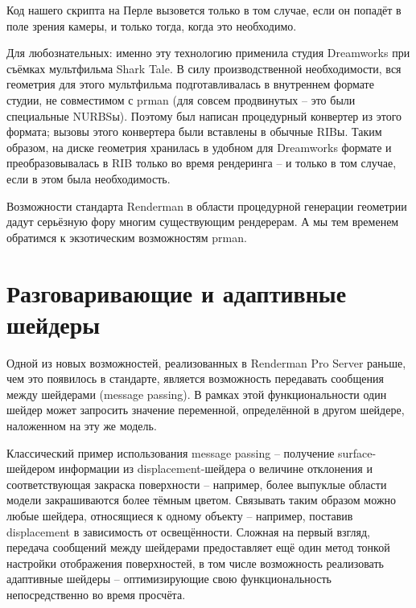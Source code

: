  Код нашего скрипта на Перле вызовется только в том
    случае, если он попадёт в поле зрения камеры, и только тогда, когда
    это необходимо.
  

 Для
    любознательных: именно эту технологию
    применила студия Dreamworks при съёмках мультфильма Shark Tale. В
    силу производственной необходимости, вся геометрия для этого
    мультфильма подготавливалась в внутреннем формате студии, не
    совместимом с prman (для совсем продвинутых – это были специальные
    NURBSы). Поэтому был написан процедурный конвертер из этого
    формата; вызовы этого конвертера были вставлены в обычные RIBы.
    Таким образом, на диске геометрия хранилась в удобном для
    Dreamworks формате и преобразовывалась в RIB только во время
    рендеринга – и только в том случае, если в этом была
    необходимость.
  

 Возможности стандарта Renderman в области
    процедурной генерации геометрии дадут серьёзную фору многим
    существующим рендерерам. А мы тем временем обратимся к экзотическим
    возможностям prman.
 
 \section*{Разговаривающие и адаптивные шейдеры}
  

 Одной из новых возможностей, реализованных в
    Renderman Pro Server раньше, чем это появилось в стандарте,
    является возможность передавать сообщения между шейдерами (message
    passing). В рамках этой функциональности один шейдер может
    запросить значение переменной, определённой в другом шейдере,
    наложенном на эту же модель.
  

 Классический пример использования message passing –
    получение surface-шейдером информации из displacement-шейдера о
    величине отклонения и соответствующая закраска поверхности –
    например, более выпуклые области модели закрашиваются более тёмным
    цветом. Связывать таким образом можно любые шейдера, относящиеся к
    одному объекту – например, поставив displacement в зависимость от
    освещённости. Сложная на первый взгляд, передача сообщений между
    шейдерами предоставляет ещё один метод тонкой настройки отображения
    поверхностей, в том числе возможность реализовать адаптивные
    шейдеры – оптимизирующие свою функциональность непосредственно во
    время просчёта.
  

